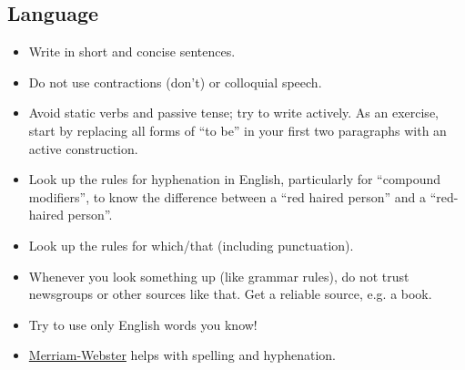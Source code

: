 \subsection{Language}
\begin{itemize}
	
	\item  Write in short and concise sentences. 
	
	
	\item  Do not use contractions (don't) or colloquial speech.
	
	\item  Avoid static verbs and passive tense; try to write actively. As an exercise, start by replacing all forms of ``to be'' in your first two paragraphs with an active construction. %
	
\item  Look up the rules for hyphenation in English, particularly for ``compound modifiers'', to know the difference between a ``red haired person'' and a ``red-haired person''.

\item  Look up the rules for which/that (including punctuation).

\item  Whenever you look something up (like grammar rules), do not trust newsgroups or other sources like that. Get a reliable source, e.g. a book.

\item  Try to use only English words you know! 

\item  \href{https://www.merriam-webster.com/}{Merriam-Webster} helps with spelling and hyphenation.
\end{itemize}

